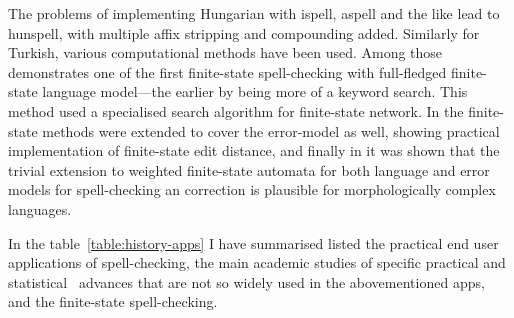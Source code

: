 \documentclass[officiallayout]{unihelcompling}
\begin{document}
The problems of implementing Hungarian with ispell, aspell and the like lead to
hunspell, with multiple affix stripping and compounding added. Similarly for
Turkish, various computational methods have been used. Among
those\citep{oflazer1996errortolerant} demonstrates one of the first finite-state
spell-checking with full-fledged finite-state language model---the earlier by
\citep{aho1975efficient} being more of a keyword search. This method used a
specialised search algorithm for finite-state network. In
\citep{agata2002typographical} the finite-state methods were extended to cover
the error-model as well, showing practical implementation of finite-state edit
distance, and finally in \citep{} it was shown that the trivial extension to
weighted finite-state automata for both language and error models for
spell-checking an correction is plausible for morphologically complex
languages.


In the table~\ref{table:history-apps} I have summarised listed the practical
end user applications of spell-checking, the main academic studies of specific
practical and statistical~\citep{al2006learning} advances that are not so widely
used in the abovementioned apps, and the finite-state spell-checking.
\end{document}
